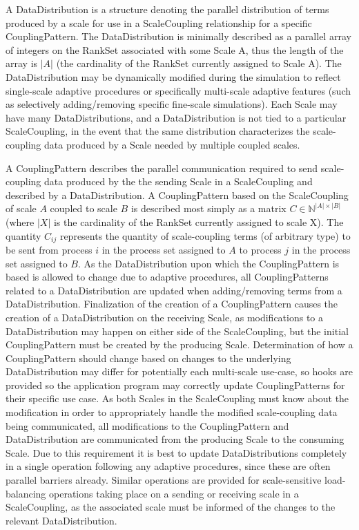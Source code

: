 \documentclass[11pt]{article}
\begin{document}
A DataDistribution is a structure denoting the parallel distribution of terms produced by a scale for use in a ScaleCoupling relationship for a specific CouplingPattern. 
The DataDistribution is minimally described as a parallel array of integers on the RankSet associated with some Scale A, thus the length of the array is $|A|$ (the cardinality of the RankSet currently assigned to Scale A).
The DataDistribution may be dynamically modified during the simulation to reflect single-scale adaptive procedures or specifically multi-scale adaptive features (such as selectively adding/removing specific fine-scale simulations). 
Each Scale may have many DataDistributions, and a DataDistribution is not tied to a particular ScaleCoupling, in the event that the same distribution characterizes the scale-coupling data produced by a Scale needed by multiple coupled scales.

A CouplingPattern describes the parallel communication required to send scale-coupling data produced by the the sending Scale in a ScaleCoupling and described by a DataDistribution. 
A CouplingPattern based on the ScaleCoupling of scale $A$ coupled to scale $B$ is described most simply as a matrix $C \in \mathbb{N}^{|A|\times|B|}$ (where $|X|$ is the cardinality of the RankSet currently assigned to scale X). 
The quantity $C_{ij}$ represents the quantity of scale-coupling terms (of arbitrary type) to be sent from process $i$ in the process set assigned to $A$ to process $j$ in the process set assigned to $B$.
As the DataDistribution upon which the CouplingPattern is based is allowed to change due to adaptive procedures, all CouplingPatterns related to a DataDistribution are updated when adding/removing terms from a DataDistribution. 
Finalization of the creation of a CouplingPattern causes the creation of a DataDistribution on the receiving Scale, as modifications to a DataDistribution may happen on either side of the ScaleCoupling, but the initial CouplingPattern must be created by the producing Scale.
Determination of how a CouplingPattern should change based on changes to the underlying DataDistribution may differ for potentially each multi-scale use-case, so hooks are provided so the application program may correctly update CouplingPatterns for their specific use case.
As both Scales in the ScaleCoupling must know about the modification in order to appropriately handle the modified scale-coupling data being communicated, all modifications to the CouplingPattern and DataDistribution are communicated from the producing Scale to the consuming Scale. 
Due to this requirement it is best to update DataDistributions completely in a single operation following any adaptive procedures, since these are often parallel barriers already.
Similar operations are provided for scale-sensitive load-balancing operations taking place on a sending or receiving scale in a ScaleCoupling, as the associated scale must be informed of the changes to the relevant DataDistribution.
\end{document}
